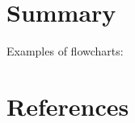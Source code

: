 \documentclass{article}
\begin{document}
\lstset{style=main_method}  %




\section{Summary}

Examples of flowcharts:
\vspace{1cm}

\vspace{2cm}


\newpage


\section{References}
\vspace{0.4cm}
\printbibliography[heading=none] %
\end{document}
